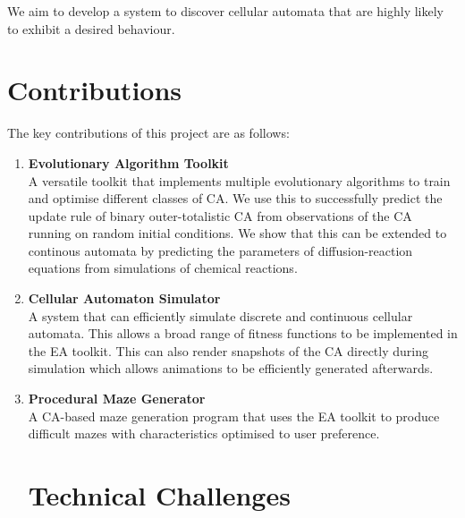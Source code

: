 We aim to develop a system to discover cellular automata that are highly likely to exhibit a desired behaviour. 

\section{Contributions}
The key contributions of this project are as follows:
\begin{enumerate}
    \item \textbf{Evolutionary Algorithm Toolkit}\\ A versatile toolkit that implements multiple evolutionary algorithms to train and optimise different classes of CA. We use this to successfully predict the update rule of binary outer-totalistic CA from observations of the CA running on random initial conditions. We show that this can be extended to continous automata by predicting the parameters of diffusion-reaction equations from simulations of chemical reactions.
    \item \textbf{Cellular Automaton Simulator}\\ A system that can efficiently simulate discrete and continuous cellular automata. This allows a broad range of fitness functions to be implemented in the EA toolkit. This can also render snapshots of the CA directly during simulation which allows animations to be efficiently generated afterwards.
    \item \textbf{Procedural Maze Generator}\\ A CA-based maze generation program that uses the EA toolkit to produce difficult mazes with characteristics optimised to user preference.
    
\section{Technical Challenges}

\end{enumerate}